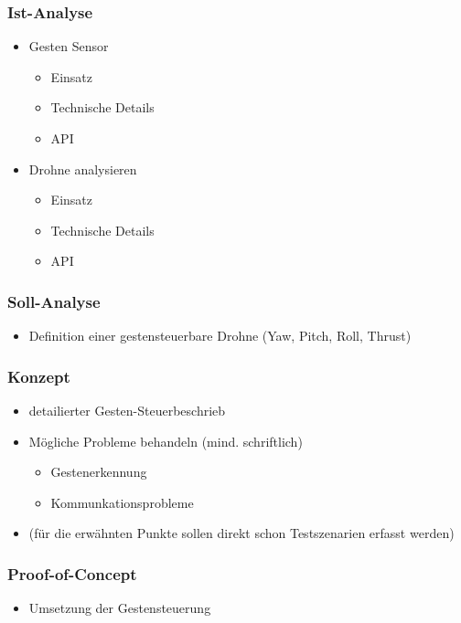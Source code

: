\subsubsection{Ist-Analyse}
\begin{itemize}
	\item Gesten Sensor
	\begin{itemize}
		\item Einsatz
		\item Technische Details
		\item API
	\end{itemize}
	
	\item Drohne analysieren
	\begin{itemize}
		\item Einsatz
		\item Technische Details
		\item API
	\end{itemize}
\end{itemize}


\subsubsection{Soll-Analyse}
\begin{itemize}
	\item Definition einer gestensteuerbare Drohne (Yaw, Pitch, Roll, Thrust)
\end{itemize}


\subsubsection{Konzept}
\begin{itemize}
	\item detailierter Gesten-Steuerbeschrieb
	\item Mögliche Probleme behandeln (mind. schriftlich)
	\begin{itemize}
		\item Gestenerkennung
		\item Kommunkationsprobleme
	\end{itemize}
	\item (für die erwähnten Punkte sollen direkt schon Testszenarien erfasst werden)
\end{itemize}


\subsubsection{Proof-of-Concept}
\begin{itemize}
	\item Umsetzung der Gestensteuerung
\end{itemize}


